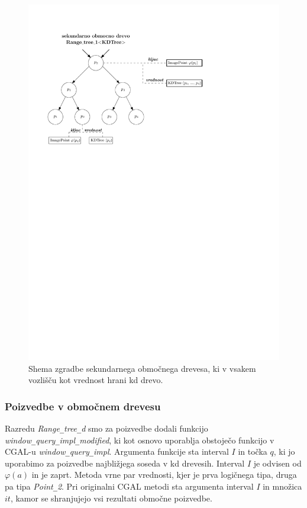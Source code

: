 \documentclass[a4paper, 12pt]{book}
\newcommand{\U}{\texttt{\_}}
\begin{document}
\begin{figure}[htp]
\centerline{\includegraphics[scale=1]{pics/range-dual-kd-2.pdf}}
\caption{Shema zgradbe sekundarnega območnega drevesa, ki v vsakem vozlišču kot vrednost hrani kd drevo.}
\label{range-dual-kd}
\end{figure}

\subsubsection{Poizvedbe v območnem drevesu}
Razredu \textit{Range\U tree\U d} smo za poizvedbe dodali funkcijo \textit{window\U que\-ry\U im\-pl\U mo\-di\-fied}, ki  kot osnovo uporablja obstoječo funkcijo v CGAL-u \textit{window\U que\-ry\U impl}. Argumenta funkcije sta interval $I$ in točka $q$, ki jo uporabimo za poizvedbe najbližjega soseda v kd drevesih. Interval $I$ je odvisen od $\varphi (a)$ in je zaprt. Metoda vrne par vrednosti, kjer je prva logičnega tipa, druga pa tipa \textit{Point\U 2}. Pri originalni CGAL metodi sta argumenta interval $I$ in množica $it$, kamor se shranjujejo vsi rezultati območne poizvedbe.
\end{document}
